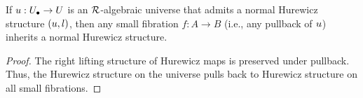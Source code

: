 \begin{lemma}\label{lem:hurewicz-over-1}
  If ${u} : {U_\bullet} \to U$ is an $\mathcal{R}$-algebraic universe 
  that admits a normal Hurewicz structure $({u}, l)$,
  then any small fibration $f : A \to B$ (i.e., any pullback of ${u}$)
  inherits a normal Hurewicz structure.
\end{lemma}
\begin{proof}
  The right lifting structure of Hurewicz maps is
  preserved under pullback.
  Thus, the Hurewicz structure on the universe pulls back to 
  Hurewicz structure on all small fibrations.
\end{proof}



